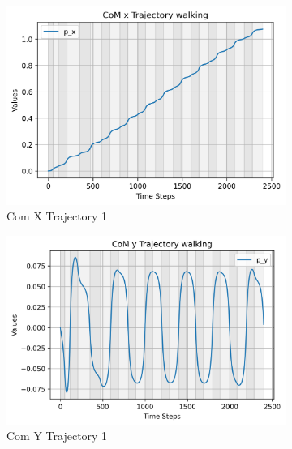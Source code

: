 \documentclass[main.tex]{subfiles}
\begin{document}
\begin{figure}[H]
    \centering
    \begin{subfigure}[b]{0.45\textwidth}
        \centering
        \includegraphics[width=\textwidth]{figures/CoM x Trajectory walking.png}
        \caption{Com X Trajectory 1}
        \label{fig:sub1_walking}
    \end{subfigure}
    \hfill
    \begin{subfigure}[b]{0.45\textwidth}
        \centering
        \includegraphics[width=\textwidth]{figures/CoM y Trajectory walking.png}
        \caption{Com Y Trajectory 1}
        \label{fig:sub2_walking}
    \end{subfigure}
    \hfill
    \begin{subfigure}[b]{0.45\textwidth}
        \centering

\end{subfigure}
\end{figure}
\end{document}
